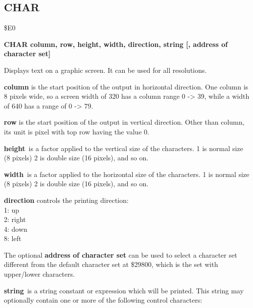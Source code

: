 \subsection{CHAR}
\begin{description}[leftmargin=2cm,style=nextline]
\item [Token:] \$E0
\item [Format:] {\bf CHAR column, row, height, width, direction, string
                [, address of character set]}
\item [Usage:]  Displays text on a graphic screen.
                It can be used for all resolutions.

                {\bf column} is the start position of the output
                in horizontal direction.
                One column is 8 pixels wide, so a screen width of 320
                has a column range 0 -> 39, while a width of 640
                has a range of 0 -> 79.

                {\bf row} is the start position of the output
                in vertical direction. Other than column, its unit is
                pixel with top row having the value 0.

                {\bf height} is a factor applied to the vertical
                size of the characters. 1 is normal size (8 pixels)
                2 is double size (16 pixels), and so on.

                {\bf width} is a factor applied to the horizontal
                size of the characters. 1 is normal size (8 pixels)
                2 is double size (16 pixels), and so on.

                {\bf direction} controls the printing direction: \\
                1: up     \\
                2: right  \\
                4: down   \\
                8: left

                The optional {\bf address of character set} can be used
                to select a character set different from the default
                character set at \$29800, which is the set with
                upper/lower characters.

                {\bf string} is a string constant or expression
                which will be printed. This string may optionally contain
                one or more of the following control characters:


\end{description}
